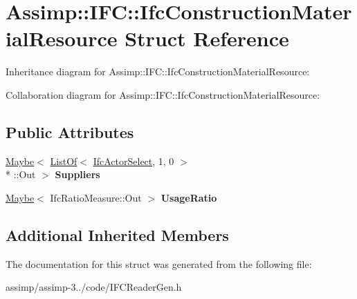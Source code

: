 \hypertarget{struct_assimp_1_1_i_f_c_1_1_ifc_construction_material_resource}{\section{Assimp\+:\+:I\+F\+C\+:\+:Ifc\+Construction\+Material\+Resource Struct Reference}
\label{struct_assimp_1_1_i_f_c_1_1_ifc_construction_material_resource}
}


Inheritance diagram for Assimp\+:\+:I\+F\+C\+:\+:Ifc\+Construction\+Material\+Resource\+:


Collaboration diagram for Assimp\+:\+:I\+F\+C\+:\+:Ifc\+Construction\+Material\+Resource\+:
\subsection*{Public Attributes}
\begin{DoxyCompactItemize}
\item 
\hypertarget{struct_assimp_1_1_i_f_c_1_1_ifc_construction_material_resource_aba5e95c126903fe73b5c614454afa07f}{\hyperlink{struct_assimp_1_1_s_t_e_p_1_1_maybe}{Maybe}$<$ \hyperlink{struct_assimp_1_1_s_t_e_p_1_1_list_of}{List\+Of}$<$ \hyperlink{class_assimp_1_1_s_t_e_p_1_1_e_x_p_r_e_s_s_1_1_data_type}{Ifc\+Actor\+Select}, 1, 0 $>$\\*
\+::Out $>$ {\bfseries Suppliers}}\label{struct_assimp_1_1_i_f_c_1_1_ifc_construction_material_resource_aba5e95c126903fe73b5c614454afa07f}

\item 
\hypertarget{struct_assimp_1_1_i_f_c_1_1_ifc_construction_material_resource_a1dfd0f67fd4b096afa8e268a2fd22753}{\hyperlink{struct_assimp_1_1_s_t_e_p_1_1_maybe}{Maybe}$<$ Ifc\+Ratio\+Measure\+::\+Out $>$ {\bfseries Usage\+Ratio}}\label{struct_assimp_1_1_i_f_c_1_1_ifc_construction_material_resource_a1dfd0f67fd4b096afa8e268a2fd22753}

\end{DoxyCompactItemize}
\subsection*{Additional Inherited Members}


The documentation for this struct was generated from the following file\+:\begin{DoxyCompactItemize}
\item 
assimp/assimp-\/3../code/I\+F\+C\+Reader\+Gen.\+h\end{DoxyCompactItemize}
